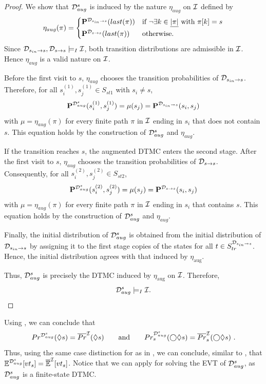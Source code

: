 \begin{proof}
    We show that $\mathcal{D}_{aug}^s$ is induced by the nature
    $\eta_{aug}$ on $\mathcal{I}$ defined by
    \[\eta_{aug}(\pi) = \begin{cases*}
        \PF^{\MC_{s_{in}\rightarrow s}}(last(\pi)) & if $\neg\exists k \in \underline{|\pi|}$ with $\pi[k] = s$\\
        \PF^{\MC_{s\rightarrow s}}(last(\pi)) & otherwise.
    \end{cases*}\]
    Since $\mathcal{D}_{s_{in}\rightarrow s},\mathcal{D}_{s\rightarrow s}\models_I\mathcal{I}$, both transition
    distributions are admissible in $\mathcal{I}$. Hence
    $\eta_{aug}$ is a valid nature on $\mathcal{I}$.

    Before the first visit to $s$, $\eta_{aug}$ chooses the
    transition probabilities of $\mathcal{D}_{s_{in}\rightarrow s}$. Therefore,
    for all $s_i^{(1)},s_j^{(1)}\in S_{st1}$ with $s_i\neq s$,
    \[
        \mathbf{P}^{\mathcal{D}_{aug}^s}(s_i^{(1)},s_j^{(1)})
        =
        \mu(s_j)
        =
        \mathbf{P}^{\mathcal{D}_{s_{in}\rightarrow s}}(s_i,s_j)
    \]
    with $\mu = \eta_{aug}(\pi)$ for every finite path $\pi$ in $\mathcal{I}$ ending in $s_i$ that does not contain
    $s$.
    This equation holds by the construction of $\mathcal{D}_{aug}^s$ and $\eta_{aug}$. 

    If the transition reaches $s$, the augmented DTMC enters the
    second stage. After the first visit to $s$, $\eta_{aug}$ chooses the
    transition probabilities of $\mathcal{D}_{s\rightarrow s}$. Consequently,
    for all $s_i^{(2)},s_j^{(2)}\in S_{st2}$,
    \[
        \mathbf{P}^{\mathcal{D}_{aug}^s}(s_i^{(2)},s_j^{(2)})
        =
        \mu(s_j)
        =
        \mathbf{P}^{\mathcal{D}_{s\rightarrow s}}(s_i,s_j)
    \]
    with $\mu = \eta_{aug}(\pi)$ for every finite path $\pi$ in $\mathcal{I}$ ending in $s_i$ that contains $s$. This equation holds by the construction of $\mathcal{D}_{aug}^s$ and $\eta_{aug}$. 

    Finally, the initial distribution of $\mathcal{D}_{aug}^s$ is obtained from
    the initial distribution of $\mathcal{D}_{s_{in}\rightarrow s}$ by assigning
    it to the first stage copies of the states for all $t\in S_{tr}^{\mathcal{D}_{s_{in}\rightarrow s}}$. Hence, the initial distribution agrees with that induced by $\eta_{\mathrm{aug}}$.

    Thus, $\mathcal{D}_{aug}^s$ is precisely the DTMC induced by
    $\eta_{\mathrm{aug}}$ on $\mathcal{I}$. Therefore,
    \[
        \mathcal{D}_{aug}^s\models_I\mathcal{I}.
    \]
\end{proof}

Using , we can conclude that
\[Pr^{\mathcal{D}_{aug}^s}(\lozenge s) = \overline{Pr}^{\mathcal{I}}(\lozenge s) \qquad \text{and} \qquad Pr^{\mathcal{D}_{aug}^s}_s(\bigcirc\lozenge s) = \overline{Pr}^{\mathcal{I}}_s(\bigcirc\lozenge s)\ .\]
Thus, using the same case distinction for  as in , we can conclude, similar to , that $\mathbb{E}^{\mathcal{D}_{aug}^s}[vt_s] = \mathbb{\overline{E}}^{\mathcal{I}}[vt_s]$. Notice that we can apply  for solving the EVT of $\mathcal{D}_{aug}^s$, as $\mathcal{D}_{aug}^s$ is a finite-state DTMC. 

